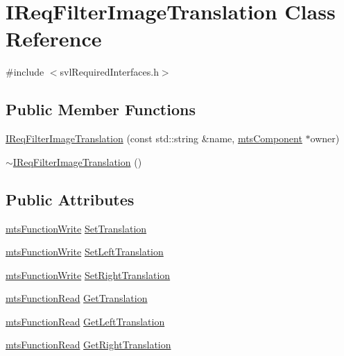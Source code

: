 \hypertarget{class_i_req_filter_image_translation}{}\section{I\+Req\+Filter\+Image\+Translation Class Reference}
\label{class_i_req_filter_image_translation}


{\ttfamily \#include $<$svl\+Required\+Interfaces.\+h$>$}

\subsection*{Public Member Functions}
\begin{DoxyCompactItemize}
\item 
\hyperlink{class_i_req_filter_image_translation_a8e766cdc2bc9f544ac605a14a710af39}{I\+Req\+Filter\+Image\+Translation} (const std\+::string \&name, \hyperlink{classmts_component}{mts\+Component} $\ast$owner)
\item 
\hyperlink{class_i_req_filter_image_translation_a83b080cd42089b5661a8afb761348923}{$\sim$\+I\+Req\+Filter\+Image\+Translation} ()
\end{DoxyCompactItemize}
\subsection*{Public Attributes}
\begin{DoxyCompactItemize}
\item 
\hyperlink{classmts_function_write}{mts\+Function\+Write} \hyperlink{class_i_req_filter_image_translation_aa40f24911962a87d74a797d9e24ad16a}{Set\+Translation}
\item 
\hyperlink{classmts_function_write}{mts\+Function\+Write} \hyperlink{class_i_req_filter_image_translation_ab99c60eed341b085741f5aec0dfda366}{Set\+Left\+Translation}
\item 
\hyperlink{classmts_function_write}{mts\+Function\+Write} \hyperlink{class_i_req_filter_image_translation_a6fcebfa71603497d6dfc6079ffcd2a64}{Set\+Right\+Translation}
\item 
\hyperlink{classmts_function_read}{mts\+Function\+Read} \hyperlink{class_i_req_filter_image_translation_a4ed27bffc9481b959e2f4eff74461095}{Get\+Translation}
\item 
\hyperlink{classmts_function_read}{mts\+Function\+Read} \hyperlink{class_i_req_filter_image_translation_a9f6ae2c070505e7b5bb9949ac9344e50}{Get\+Left\+Translation}
\item 
\hyperlink{classmts_function_read}{mts\+Function\+Read} \hyperlink{class_i_req_filter_image_translation_a0e4cedffbd716f412e37ada2ba0501bd}{Get\+Right\+Translation}
\end{DoxyCompactItemize}


